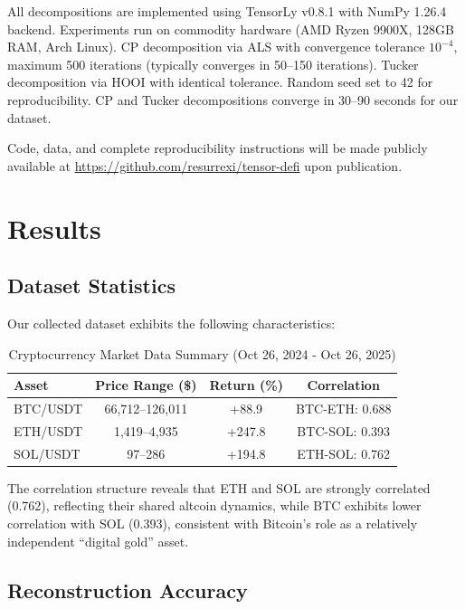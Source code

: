 \documentclass{article}
\begin{document}
All decompositions are implemented using TensorLy v0.8.1 \citep{Kossaifi2019TensorLy} with NumPy 1.26.4 backend. Experiments run on commodity hardware (AMD Ryzen 9900X, 128GB RAM, Arch Linux). CP decomposition via ALS with convergence tolerance $10^{-4}$, maximum 500 iterations (typically converges in 50--150 iterations). Tucker decomposition via HOOI with identical tolerance. Random seed set to 42 for reproducibility. CP and Tucker decompositions converge in 30--90 seconds for our dataset.

Code, data, and complete reproducibility instructions will be made publicly available at \url{https://github.com/resurrexi/tensor-defi} upon publication.

\section{Results}
\label{sec:results}

\subsection{Dataset Statistics}

Our collected dataset exhibits the following characteristics:

\begin{table}[htbp]
\centering
\small
\caption{Cryptocurrency Market Data Summary (Oct 26, 2024 - Oct 26, 2025)}
\label{tbl:dataset-stats}
\begin{tabular}{lccc}
\toprule
\textbf{Asset} & \textbf{Price Range (\$)} & \textbf{Return (\%)} & \textbf{Correlation} \\
\midrule
BTC/USDT & 66,712--126,011 & +88.9 & BTC-ETH: 0.688 \\
ETH/USDT & 1,419--4,935 & +247.8 & BTC-SOL: 0.393 \\
SOL/USDT & 97--286 & +194.8 & ETH-SOL: 0.762 \\
\bottomrule
\end{tabular}
\end{table}

The correlation structure reveals that ETH and SOL are strongly correlated (0.762), reflecting their shared altcoin dynamics, while BTC exhibits lower correlation with SOL (0.393), consistent with Bitcoin's role as a relatively independent ``digital gold'' asset.

\subsection{Reconstruction Accuracy}
\end{document}
